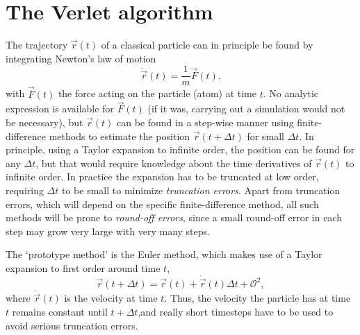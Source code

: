 \documentclass[11pt,bibliography=totoc,index=totoc]{scrbook}   %
\begin{document}
\section{The Verlet algorithm}\label{sec:verlet-algo}

The trajectory $\vec{r}(t)$ of a classical particle can in principle be found by integrating Newton's law of motion
\begin{equation}
  \ddot{\vec{r}}(t) = \frac{1}{m}\vec{F}(t).
\end{equation}
with $\vec{F}(t)$ the force acting on the particle (atom) at time $t$. 
No analytic expression is available for $\vec{F}(t)$ (if it was, carrying out a simulation would not be necessary),
but $\vec{r}(t)$ can be found in a step-wise manner using finite-difference methods 
to estimate the position $\vec{r}(t+\Delta t)$ for small $\Delta t$. 
In principle, using a Taylor expansion to infinite order, the position can be found for any $\Delta t$, but that would require knowledge about the time derivatives of $\vec{r}(t)$ to infinite order. 
In practice the expansion has to be truncated at low order, requiring $\Delta t$ to be small to minimize \emph{truncation errors}.
Apart from truncation errors, which will depend on the specific finite-difference method, all such methods will be prone to \emph{round-off errors}, since a small round-off error in each step may grow very large with very many steps.

The `prototype method' is the Euler method, which makes use of a Taylor expansion to first order around time $t$,
\begin{equation}
  \vec{r}(t+\Delta t) = \vec{r}(t) + \dot{\vec{r}}(t)\Delta t + \mathcal{O}^2,
\end{equation}
where $\dot{\vec{r}}(t)$ is the velocity at time $t$. Thus, the velocity the particle has at time $t$ remains constant until $t+\Delta t$,and really short timesteps have to be used to avoid serious truncation errors.
\end{document}
